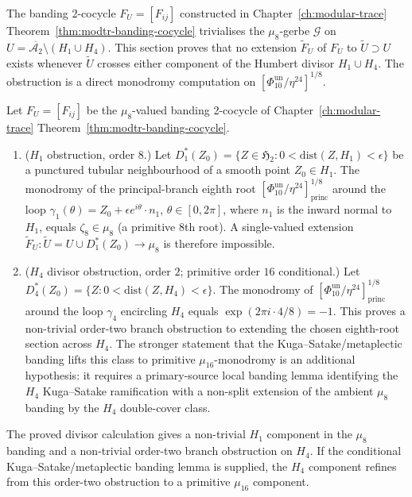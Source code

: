 The banding 2-cocycle $F_U = [F_{ij}]$ constructed in
Chapter~\ref{ch:modular-trace}
Theorem~\ref{thm:modtr-banding-cocycle} trivialises the
$\mu_8$-gerbe $\mathcal G$ on
$U = \overline{\mathcal A_2}\setminus(H_1\cup H_4)$. This section
proves that no extension $\widetilde F_U$ of $F_U$ to
$\widetilde U\supset U$ exists whenever $\widetilde U$ crosses either
component of the Humbert divisor $H_1\cup H_4$. The obstruction is a
direct monodromy computation on $[\Phi_{10}^{\mathrm{un}}/\eta^{24}]^{1/8}$.

\begin{theorem}
\label{thm:qgf-humbert-non-extendability}
Let $F_U = [F_{ij}]$ be the $\mu_8$-valued banding 2-cocycle of
Chapter~\ref{ch:modular-trace}
Theorem~\ref{thm:modtr-banding-cocycle}.
\begin{enumerate}[label=\textup{(\roman*)}]
\item ($H_1$ obstruction, order $8$.) Let
 $D^*_1(Z_0) = \{Z\in\mathfrak H_2 : 0 < \mathrm{dist}(Z, H_1) < \epsilon\}$
 be a punctured tubular neighbourhood of a smooth point $Z_0\in H_1$.
 The monodromy of the principal-branch eighth root
 $[\Phi_{10}^{\mathrm{un}}/\eta^{24}]^{1/8}_{\mathrm{princ}}$ around the loop
 $\gamma_1(\theta) = Z_0 + \epsilon e^{i\theta}\cdot n_1$,
 $\theta\in[0, 2\pi]$, where $n_1$ is the inward normal to
 $H_1$, equals $\zeta_8\in\mu_8$ (a primitive $8$th root). A
 single-valued extension
 $\widetilde F_U\colon\widetilde U = U\cup D^*_1(Z_0)\to\mu_8$
 is therefore impossible.
\item ($H_4$ divisor obstruction, order $2$; primitive order $16$
conditional.) Let
 $D^*_4(Z_0) = \{Z : 0 < \mathrm{dist}(Z, H_4) < \epsilon\}$.
 The monodromy of $[\Phi_{10}^{\mathrm{un}}/\eta^{24}]^{1/8}_{\mathrm{princ}}$
 around the loop $\gamma_4$ encircling $H_4$ equals
 $\exp(2\pi i\cdot4/8)=-1$. This proves a non-trivial order-two
 branch obstruction to extending the chosen eighth-root section across
 $H_4$. The stronger statement that the Kuga--Satake/metaplectic
 banding lifts this class to primitive $\mu_{16}$-monodromy is an
 additional hypothesis: it requires a primary-source local banding lemma
 identifying the $H_4$ Kuga--Satake ramification with a non-split
 extension of the ambient $\mu_8$ banding by the $H_4$ double-cover
 class.
\end{enumerate}
The proved divisor calculation gives a non-trivial $H_1$ component in
the $\mu_8$ banding and a non-trivial order-two branch obstruction on
$H_4$. If the conditional Kuga--Satake/metaplectic banding lemma is
supplied, the $H_4$ component refines from this order-two obstruction to
a primitive $\mu_{16}$ component.
\end{theorem}

